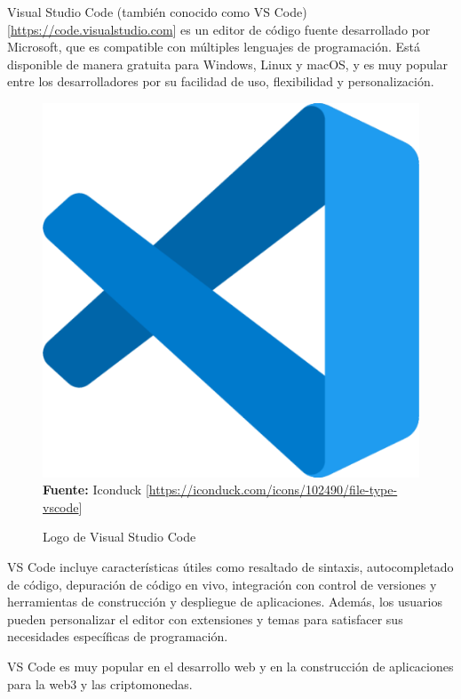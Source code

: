 Visual Studio Code (también conocido como VS Code)
[\url{https://code.visualstudio.com}] es un editor de código fuente
desarrollado por Microsoft, que es compatible con múltiples lenguajes de
programación. Está disponible de manera gratuita para Windows, Linux y macOS, y
es muy popular entre los desarrolladores por su facilidad de uso, flexibilidad
y personalización.
\begin{figure}[htb!]
      \centering
      \caption{Logo de Visual Studio Code}
      \label{fig:vscode-logo}
      \centering
      \includegraphics[scale=0.1]{./Ilustraciones/logos/vscode-logo.png}\\
      \textbf{Fuente:} Iconduck [\url{https://iconduck.com/icons/102490/file-type-vscode}]
\end{figure}
\hfill \break

VS Code incluye características útiles como resaltado de sintaxis,
autocompletado de código, depuración de código en vivo, integración con control
de versiones y herramientas de construcción y despliegue de aplicaciones.
Además, los usuarios pueden personalizar el editor con extensiones y temas para
satisfacer sus necesidades específicas de programación.

VS Code es muy popular en el desarrollo web y en la construcción de
aplicaciones para la web3 y las criptomonedas.

